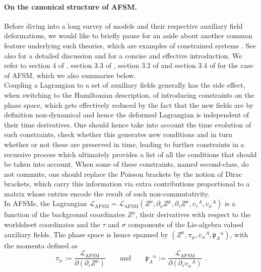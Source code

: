 \documentclass[12pt]{article}
\numberwithin{equation}{section}
\begin{document}
\paragraph{On the canonical structure of AFSM.} Before diving into a long survey of models and their respective auxiliary field deformations, we would like to briefly pause for an aside about another common feature underlying such theories, which are examples of constrained systems \cite{Dirac:1964:LQM}.   See also \cite{henneaux1992quantization} for a detailed discussion and \cite{mann2018lagrangianandhamiltoniandynamics} for a concise and effective introduction. We refer to section 4 of \cite{Ferko:2024ali}, section 3.3 of \cite{Bielli:2024ach}, section 3.2 of \cite{Cesaro:2024ipq} and section 3.4 of \cite{Cesaro:2025msv} for the case of AFSM, which we also summarise below. \\
\indent
Coupling a Lagrangian to a set of auxiliary fields generally has the side effect, when switching to the Hamiltonian description, of introducing constraints on the phase space, which gets effectively reduced by the fact that the new fields are by definition non-dynamical and hence the deformed Lagrangian is independent of their time derivatives. One should hence take into account the time evolution of such constraints, check whether this generates new conditions and in turn whether or not these are preserved in time, leading to further constraints in a recursive process which ultimately provides a list of all the conditions that should be taken into account. When some of these constraints, named second-class, do not commute, one should replace the Poisson brackets by the notion of Dirac brackets, which carry this information via extra contributions proportional to a matrix whose entries encode the result of such non-commutativity.\\
\indent
In AFSMs, the Lagrangian $\mathcal{L}_{\text{AFSM}}=\mathcal{L}_{\text{AFSM}}(Z^{\mu},\partial_{\sigma}Z^{\mu},\partial_{\tau}Z^{\mu},v_{\tau}{}^{A},v_{\sigma}{}^{A})$ is a function of the background coordinates $Z^{\mu}$, their derivatives with respect to the worldsheet coordinates and the $\tau$ and $\sigma$ components of the Lie-algebra valued auxiliary fields. The phase space is hence spanned by $(Z^{\mu},\pi_{\mu},v_{\alpha}{}^{A},\mathfrak{p}_{A}{}^{\alpha})$, with the momenta defined as
\begin{equation}
\pi_{\mu}:=\frac{\mathcal{L}_{\text{AFSM}}}{\partial(\partial_{\tau}Z^{\mu})}
\qquad \text{and} \qquad 
\mathfrak{p}_{A}{}^{\alpha}:=\frac{\mathcal{L}_{\text{AFSM}}}{\partial (\partial_{\tau}v_{\alpha}{}^{A})} \,\, .
\end{equation}
\end{document}
